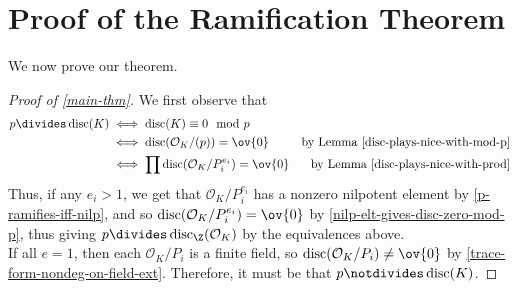 \documentclass[11pt,leqno,oneside]{amsart}
\numberwithin{thm}{section}
\renewcommand{\O}{\mathcal{O}}
\newcommand{\disc}{\operatorname{disc}}
\begin{document}
\section{Proof of the Ramification Theorem}
We now prove our theorem.
\begin{proof}[Proof of \ref{main-thm}]
  We first observe that
  \begin{align*}
    p \divides \disc(K)
    & \iff \disc(K) \equiv 0 \mod p\\
    & \iff \disc(\O_K/(p)) = \ov{0} & \text{by Lemma \ref{disc-plays-nice-with-mod-p}}\\
    & \iff \prod \disc(\O_K/P_i^{e_i}) = \ov{0}
      & \text{by Lemma \ref{disc-plays-nice-with-prod}}
  \end{align*}
  Thus, if any \(e_i > 1\), we get that \(\O_K/P_i^{e_i}\) has a
  nonzero nilpotent element by \ref{p-ramifies-iff-nilp}, and so \(\disc(\O_K/P_i^{e_i})
  = \ov{0}\) by \ref{nilp-elt-gives-disc-zero-mod-p}, thus giving \(p
  \divides \disc_\Z(\O_K)\) by the 
  equivalences above. \\

  If all \(e = 1\), then each \(\O_K/P_i\) is a finite field, so
  \(\disc(\O_K/P_i) \neq \ov{0}\) by
  \ref{trace-form-nondeg-on-field-ext}.
  Therefore, it must be that \(p \notdivides \disc(K)\).
\end{proof}
\end{document}
